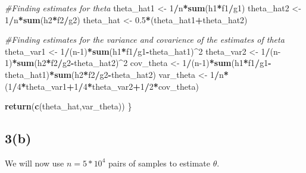 \documentclass[
]{article}
\newenvironment{Shaded}{\begin{snugshade}}{\end{snugshade}}
\newcommand{\CommentTok}[1]{\textcolor[rgb]{0.56,0.35,0.01}{\textit{#1}}}
\newcommand{\DecValTok}[1]{\textcolor[rgb]{0.00,0.00,0.81}{#1}}
\newcommand{\FloatTok}[1]{\textcolor[rgb]{0.00,0.00,0.81}{#1}}
\newcommand{\KeywordTok}[1]{\textcolor[rgb]{0.13,0.29,0.53}{\textbf{#1}}}
\newcommand{\NormalTok}[1]{#1}
\newcommand{\OperatorTok}[1]{\textcolor[rgb]{0.81,0.36,0.00}{\textbf{#1}}}
\newcommand{\StringTok}[1]{\textcolor[rgb]{0.31,0.60,0.02}{#1}}
\begin{document}
\begin{Shaded}
\begin{Highlighting}[]
  \CommentTok{#Finding estimates for theta}
\NormalTok{  theta_hat1 <-}\StringTok{ }\DecValTok{1}\OperatorTok{/}\NormalTok{n}\OperatorTok{*}\KeywordTok{sum}\NormalTok{(h1}\OperatorTok{*}\NormalTok{f1}\OperatorTok{/}\NormalTok{g1)}
\NormalTok{  theta_hat2 <-}\StringTok{ }\DecValTok{1}\OperatorTok{/}\NormalTok{n}\OperatorTok{*}\KeywordTok{sum}\NormalTok{(h2}\OperatorTok{*}\NormalTok{f2}\OperatorTok{/}\NormalTok{g2)}
\NormalTok{  theta_hat <-}\StringTok{ }\FloatTok{0.5}\OperatorTok{*}\NormalTok{(theta_hat1}\OperatorTok{+}\NormalTok{theta_hat2)}
  
  \CommentTok{#Finding estimates for the variance and covarience of the estimates of theta}
\NormalTok{  theta_var1 <-}\StringTok{ }\DecValTok{1}\OperatorTok{/}\NormalTok{(n}\DecValTok{-1}\NormalTok{)}\OperatorTok{*}\KeywordTok{sum}\NormalTok{(h1}\OperatorTok{*}\NormalTok{f1}\OperatorTok{/}\NormalTok{g1}\OperatorTok{-}\NormalTok{theta_hat1)}\OperatorTok{^}\DecValTok{2}
\NormalTok{  theta_var2 <-}\StringTok{ }\DecValTok{1}\OperatorTok{/}\NormalTok{(n}\DecValTok{-1}\NormalTok{)}\OperatorTok{*}\KeywordTok{sum}\NormalTok{(h2}\OperatorTok{*}\NormalTok{f2}\OperatorTok{/}\NormalTok{g2}\OperatorTok{-}\NormalTok{theta_hat2)}\OperatorTok{^}\DecValTok{2}
\NormalTok{  cov_theta <-}\StringTok{ }\DecValTok{1}\OperatorTok{/}\NormalTok{(n}\DecValTok{-1}\NormalTok{)}\OperatorTok{*}\KeywordTok{sum}\NormalTok{(h1}\OperatorTok{*}\NormalTok{f1}\OperatorTok{/}\NormalTok{g1}\OperatorTok{-}\NormalTok{theta_hat1)}\OperatorTok{*}\KeywordTok{sum}\NormalTok{(h2}\OperatorTok{*}\NormalTok{f2}\OperatorTok{/}\NormalTok{g2}\OperatorTok{-}\NormalTok{theta_hat2)}
\NormalTok{  var_theta <-}\StringTok{ }\DecValTok{1}\OperatorTok{/}\NormalTok{n}\OperatorTok{*}\NormalTok{(}\DecValTok{1}\OperatorTok{/}\DecValTok{4}\OperatorTok{*}\NormalTok{theta_var1}\OperatorTok{+}\DecValTok{1}\OperatorTok{/}\DecValTok{4}\OperatorTok{*}\NormalTok{theta_var2}\OperatorTok{+}\DecValTok{1}\OperatorTok{/}\DecValTok{2}\OperatorTok{*}\NormalTok{cov_theta)}

  \KeywordTok{return}\NormalTok{(}\KeywordTok{c}\NormalTok{(theta_hat,var_theta))}
\NormalTok{\}}
\end{Highlighting}
\end{Shaded}

\hypertarget{b-2}{%
\subsection{3(b)}\label{b-2}}

We will now use \(n=5*10^4\) pairs of samples to estimate \(\theta\).
\end{document}

